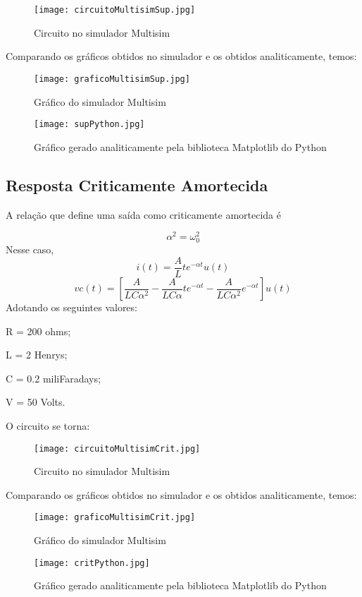 \documentclass[12pt]{article}
\begin{document}
	\begin{figure}[!h]
		\centering
		\texttt{[image: circuitoMultisimSup.jpg]}
		\caption{Circuito no simulador Multisim}
	\end{figure}
	
	Comparando os gráficos obtidos no simulador e os obtidos analiticamente, temos:
	
	\begin{figure}[!h]
		\centering
		\texttt{[image: graficoMultisimSup.jpg]}
		\caption{Gráfico do simulador Multisim}
	\end{figure}
	\begin{figure}[!h]
		\centering
		\texttt{[image: supPython.jpg]}
		\caption{Gráfico gerado analiticamente pela biblioteca Matplotlib do Python}
	\end{figure}
	\pagebreak
	\vspace*{2cm}
	\subsection{Resposta Criticamente Amortecida}
	A relação que define uma saída como criticamente amortecida é 
	
	\begin{equation}
		\alpha^2 = \omega_0 ^2
	\end{equation}
	Nesse caso,
	\begin{equation}
		i(t) = \frac{A}{L}te^{-\alpha t}u(t)
	\end{equation}
	\begin{equation}
		vc(t) = [\frac{A}{LC\alpha^2 } - \frac{A}{LC\alpha}te^{-\alpha t} - \frac{A}{LC\alpha^2}e^{-\alpha t}]u(t)
	\end{equation}
	Adotando os seguintes valores: 

	R = 200 ohms; 
	
	L = 2 Henrys;
	
	C = 0.2 miliFaradays; 
	
	V = 50 Volts.
	
	O circuito se torna:
	
	\begin{figure}[!h]
		\centering
		\texttt{[image: circuitoMultisimCrit.jpg]}
		\caption{Circuito no simulador Multisim}
	\end{figure}
	
	Comparando os gráficos obtidos no simulador e os obtidos analiticamente, temos:
	\begin{figure}[!h]
		\centering
		\texttt{[image: graficoMultisimCrit.jpg]}
		\caption{Gráfico do simulador Multisim}
	\end{figure}
		\begin{figure}[!h]
		\centering
		\texttt{[image: critPython.jpg]}
		\caption{Gráfico gerado analiticamente pela biblioteca Matplotlib do Python}
	\end{figure}
	\pagebreak
	\vspace*{2cm}
\end{document}
